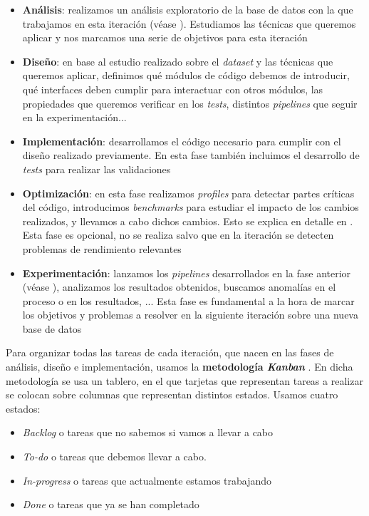 \begin{itemize}
    \item \textbf{Análisis}: realizamos un análisis exploratorio de la base de datos con la que trabajamos en esta iteración (véase ). Estudiamos las técnicas que queremos aplicar y nos marcamos una serie de objetivos para esta iteración
    \item \textbf{Diseño}: en base al estudio realizado sobre el \textit{dataset} y las técnicas que queremos aplicar, definimos qué módulos de código debemos de introducir, qué interfaces deben cumplir para interactuar con otros módulos, las propiedades que queremos verificar en los \textit{tests}, distintos \textit{pipelines} que seguir en la experimentación...
    \item \textbf{Implementación}: desarrollamos el código necesario para cumplir con el diseño realizado previamente. En esta fase también incluimos el desarrollo de \textit{tests} para realizar las validaciones
    \item \textbf{Optimización}: en esta fase realizamos \textit{profiles} para detectar partes críticas del código, introducimos \textit{benchmarks} para estudiar el impacto de los cambios realizados, y llevamos a cabo dichos cambios. Esto se explica en detalle en . Esta fase es opcional, no se realiza salvo que en la iteración se detecten problemas de rendimiento relevantes
    \item \textbf{Experimentación}: lanzamos los \textit{pipelines} desarrollados en la fase anterior (véase ), analizamos los resultados obtenidos, buscamos anomalías en el proceso o en los resultados, ... Esta fase es fundamental a la hora de marcar los objetivos y problemas a resolver en la siguiente iteración sobre una nueva base de datos
\end{itemize}

Para organizar todas las tareas de cada iteración, que nacen en las fases de análisis, diseño e implementación, usamos la \textbf{metodología \textit{Kanban}} \cite{informatica:kanban_paper}. En dicha metodología se usa un tablero, en el que tarjetas que representan tareas a realizar se colocan sobre columnas que representan distintos estados. Usamos cuatro estados:

\begin{itemize}
    \item \textit{Backlog} o tareas que no sabemos si vamos a llevar a cabo
    \item \textit{To-do} o tareas que debemos llevar a cabo.
    \item \textit{In-progress} o tareas que actualmente estamos trabajando
    \item \textit{Done} o tareas que ya se han completado
\end{itemize}

